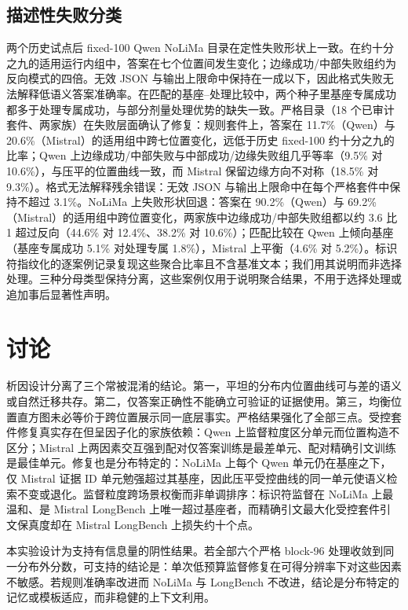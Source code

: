 \documentclass[11pt]{article}
\begin{document}
\subsection{描述性失败分类}

两个历史试点后 fixed-100 Qwen NoLiMa 目录在定性失败形状上一致。在约十分之九的适用运行内组中，答案在七个位置间发生变化；边缘成功/中部失败组约为反向模式的四倍。无效 JSON 与输出上限命中保持在一成以下，因此格式失败无法解释低语义答案准确率。在匹配的基座--处理比较中，两个种子里基座专属成功都多于处理专属成功，与部分剂量处理优势的缺失一致。严格目录（18 个已审计套件、两家族）在失败层面确认了修复：规则套件上，答案在 11.7\%（Qwen）与 20.6\%（Mistral）的适用组中跨七位置变化，远低于历史 fixed-100 约十分之九的比率；Qwen 上边缘成功/中部失败与中部成功/边缘失败组几乎等率（9.5\% 对 10.6\%），与压平的位置曲线一致，而 Mistral 保留边缘方向不对称（18.5\% 对 9.3\%）。格式无法解释残余错误：无效 JSON 与输出上限命中在每个严格套件中保持不超过 3.1\%。NoLiMa 上失败形状回退：答案在 90.2\%（Qwen）与 69.2\%（Mistral）的适用组中跨位置变化，两家族中边缘成功/中部失败组都以约 3.6 比 1 超过反向（44.6\% 对 12.4\%、38.2\% 对 10.6\%）；匹配比较在 Qwen 上倾向基座（基座专属成功 5.1\% 对处理专属 1.8\%），Mistral 上平衡（4.6\% 对 5.2\%）。标识符指纹化的逐案例记录复现这些聚合比率且不含基准文本；我们用其说明而非选择处理。三种分母类型保持分离，这些案例仅用于说明聚合结果，不用于选择处理或追加事后显著性声明。

\section{讨论}

析因设计分离了三个常被混淆的结论。第一，平坦的分布内位置曲线可与差的语义或自然迁移共存。第二，仅答案正确性不能确立可验证的证据使用。第三，均衡位置直方图未必等价于跨位置展示同一底层事实。严格结果强化了全部三点。受控套件修复真实存在但呈因子化的家族依赖：Qwen 上监督粒度区分单元而位置构造不区分；Mistral 上两因素交互强到配对仅答案训练是最差单元、配对精确引文训练是最佳单元。修复也是分布特定的：NoLiMa 上每个 Qwen 单元仍在基座之下，仅 Mistral 证据 ID 单元勉强超过其基座，因此压平受控曲线的同一单元使语义检索不变或退化。监督粒度跨场景权衡而非单调排序：标识符监督在 NoLiMa 上最温和、是 Mistral LongBench 上唯一超过基座者，而精确引文最大化受控套件引文保真度却在 Mistral LongBench 上损失约十个点。

本实验设计为支持有信息量的阴性结果。若全部六个严格 block-96 处理收敛到同一分布外分数，可支持的结论是：单次低预算监督修复在可得分辨率下对这些因素不敏感。若规则准确率改进而 NoLiMa 与 LongBench 不改进，结论是分布特定的记忆或模板适应，而非稳健的上下文利用。
\end{document}
